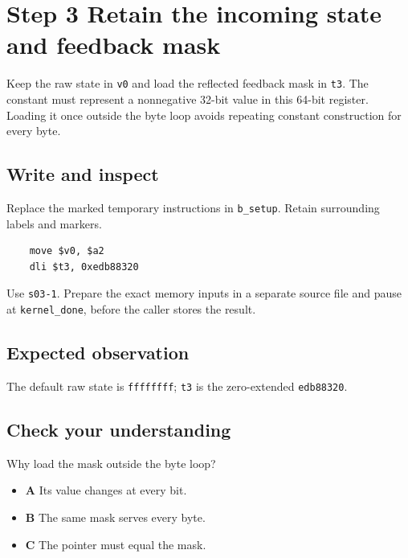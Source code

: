 \section{Step 3 Retain the incoming state and feedback mask}\label{crc-s03}

Keep the raw state in \texttt{v0} and load the reflected feedback mask in \texttt{t3}. The constant must represent a nonnegative 32-bit value in this 64-bit register. Loading it once outside the byte loop avoids repeating constant construction for every byte.

\subsection{Write and inspect}
Replace the marked temporary instructions in \texttt{b\_setup}. Retain surrounding labels and markers.

\begin{verbatim}
    move $v0, $a2
    dli $t3, 0xedb88320
\end{verbatim}

Use \texttt{s03-1}. Prepare the exact memory inputs in a separate source file and pause at \texttt{kernel\_done}, before the caller stores the result.

\subsection{Expected observation}
The default raw state is \texttt{ffffffff}; \texttt{t3} is the zero-extended \texttt{edb88320}.

\subsection{Check your understanding}
Why load the mask outside the byte loop?

\begin{itemize}
  \item \textbf{A} Its value changes at every bit.
  \item \textbf{B} The same mask serves every byte.
  \item \textbf{C} The pointer must equal the mask.
\end{itemize}
